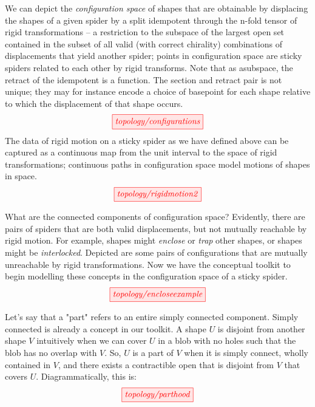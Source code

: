 \begin{myboxB}
\begin{defn}\label{defn:configurationspace}
We can depict the \emph{configuration space} of shapes that are obtainable by displacing the shapes of a given spider by a split idempotent through the n-fold tensor of rigid transformations -- a restriction to the subspace of the largest open set contained in the subset of all valid (with correct chirality) combinations of displacements that yield another spider; points in configuration space are sticky spiders related to each other by rigid transforms. Note that as asubspace, the retract of the idempotent is a function. The section and retract pair is not unique; they may for instance encode a choice of basepoint for each shape relative to which the displacement of that shape occurs.
\[\tikzfig{topology/configurations}\]
The data of rigid motion on a sticky spider as we have defined above can be captured as a continuous map from the unit interval to the space of rigid transformations; continuous paths in configuration space model motions of shapes in space.
\[\tikzfig{topology/rigidmotion2}\]
\end{defn}
\end{myboxB}

\begin{myboxR}
\begin{example}
What are the connected components of configuration space? Evidently, there are pairs of spiders that are both valid displacements, but not mutually reachable by rigid motion. For example, shapes might \emph{enclose} or \emph{trap} other shapes, or shapes might be \emph{interlocked}. Depicted are some pairs of configurations that are mutually unreachable by rigid transformations. Now we have the conceptual toolkit to begin modelling these concepts in the configuration space of a sticky spider.
\[\tikzfig{topology/encloseexample}\]
\end{example}
\end{myboxR}


\begin{myboxB}
\begin{defn}[Parthood]\label{defn:parthood}
Let's say that a "part" refers to an entire simply connected component. Simply connected is already a concept in our toolkit. A shape $U$ is disjoint from another shape $V$ intuitively when we can cover $U$ in a blob with no holes such that the blob has no overlap with $V$. So, $U$ is a part of $V$ when it is simply connect, wholly contained in $V$, and there exists a contractible open that is disjoint from $V$ that covers $U$. Diagrammatically, this is:
\[\tikzfig{topology/parthood}\]
\end{defn}

\end{myboxB}

